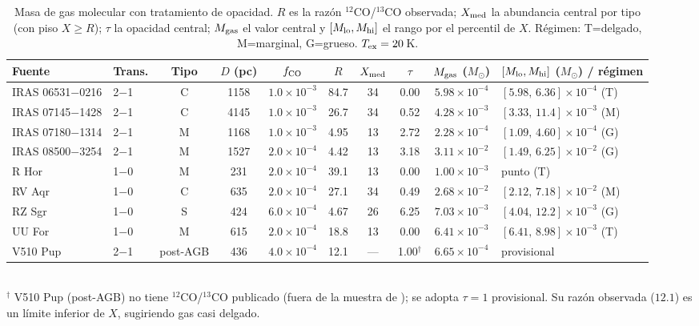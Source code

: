 \documentclass[12pt, a4paper]{article}
\begin{document}
\begin{landscape}
\begin{table}[h]
\centering
\caption{Masa de gas molecular con tratamiento de opacidad. $R$ es la razón
$^{12}$CO/$^{13}$CO observada; $X_{\rm med}$ la abundancia central por tipo (con piso
$X\geq R$); $\tau$ la opacidad central; $M_{\rm gas}$ el valor central y
$[M_{\rm lo},M_{\rm hi}]$ el rango por el percentil de $X$. Régimen: T=delgado, M=marginal,
G=grueso. $T_{\rm ex}=20$\,K.}
\label{tab:mass}
\begin{tabular}{llcccccccl}
\toprule
Fuente & Trans. & Tipo & $D$ (pc) & $f_{\rm CO}$ & $R$ & $X_{\rm med}$ & $\tau$ &
$M_{\rm gas}$ ($M_\odot$) & $[M_{\rm lo},M_{\rm hi}]$ ($M_\odot$) / régimen \\
\midrule
IRAS 06531$-$0216 & 2$-$1 & C & 1158 & $1.0\!\times\!10^{-3}$ & 84.7 & 34 & 0.00 & $5.98\times10^{-4}$ & $[5.98,\,6.36]\times10^{-4}$ \;\;(T) \\
IRAS 07145$-$1428 & 2$-$1 & C & 4145 & $1.0\!\times\!10^{-3}$ & 26.7 & 34 & 0.52 & $4.28\times10^{-3}$ & $[3.33,\,11.4]\times10^{-3}$ \;\;(M) \\
IRAS 07180$-$1314 & 2$-$1 & M & 1168 & $1.0\!\times\!10^{-3}$ & 4.95 & 13 & 2.72 & $2.28\times10^{-4}$ & $[1.09,\,4.60]\times10^{-4}$ \;\;(G) \\
IRAS 08500$-$3254 & 2$-$1 & M & 1527 & $2.0\!\times\!10^{-4}$ & 4.42 & 13 & 3.18 & $3.11\times10^{-2}$ & $[1.49,\,6.25]\times10^{-2}$ \;\;(G) \\
R Hor             & 1$-$0 & M &  231 & $2.0\!\times\!10^{-4}$ & 39.1 & 13 & 0.00 & $1.00\times10^{-3}$ & punto \;\;(T) \\
RV Aqr            & 1$-$0 & C &  635 & $2.0\!\times\!10^{-4}$ & 27.1 & 34 & 0.49 & $2.68\times10^{-2}$ & $[2.12,\,7.18]\times10^{-2}$ \;\;(M) \\
RZ Sgr            & 1$-$0 & S &  424 & $6.0\!\times\!10^{-4}$ & 4.67 & 26 & 6.25 & $7.03\times10^{-3}$ & $[4.04,\,12.2]\times10^{-3}$ \;\;(G) \\
UU For            & 1$-$0 & M &  615 & $2.0\!\times\!10^{-4}$ & 18.8 & 13 & 0.00 & $6.41\times10^{-3}$ & $[6.41,\,8.98]\times10^{-3}$ \;\;(T) \\
V510 Pup          & 2$-$1 & post-AGB & 436 & $4.0\!\times\!10^{-4}$ & 12.1 & --- & 1.00$^{\dagger}$ & $6.65\times10^{-4}$ & provisional \\
\bottomrule
\end{tabular}
\\[0.3em]
{\footnotesize $^{\dagger}$ V510 Pup (post-AGB) no tiene $^{12}$CO/$^{13}$CO publicado
(fuera de la muestra de \citealp{ramstedt2014}); se adopta $\tau=1$ provisional. Su razón
observada ($12.1$) es un límite inferior de $X$, sugiriendo gas casi delgado.}
\end{table}
\end{landscape}
\end{document}
